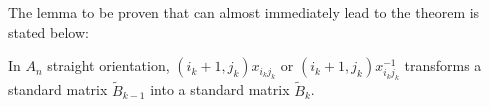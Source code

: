 \indent The lemma to be proven that can almost immediately lead to the theorem is stated below:\\
\begin{lemma}
In $A_n$ straight orientation, $(i_k+1,j_k)x_{i_kj_k}$ or $(i_k+1,j_k)x_{i_kj_k}^{-1}$ transforms a standard matrix $\tilde{B}_{k-1}$ into a standard matrix $\tilde{B}_k$.\\
\end{lemma}
